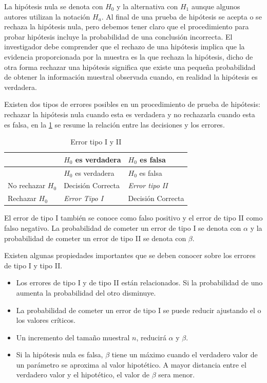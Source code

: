 \documentclass[letterpaper,]{book}
\providecommand{\tightlist}{%
  \setlength{\itemsep}{0pt}\setlength{\parskip}{0pt}}
\begin{document}
La hipótesis nula se denota con \(H_0\) y la alternativa con \(H_1\) aunque algunos autores utilizan la notación \(H_a\). Al final de una prueba de hipótesis se acepta o se rechaza la hipótesis nula, pero debemos tener claro que el procedimiento para probar hipótesis incluye la probabilidad de una conclusión incorrecta. El investigador debe comprender que el rechazo de una hipótesis implica que la evidencia proporcionada por la muestra es la que rechaza la hipótesis, dicho de otra forma rechazar una hipótesis significa que existe una pequeña probabilidad de obtener la información muestral observada cuando, en realidad la hipótesis es verdadera.

Existen dos tipos de errores posibles en un procedimiento de prueba de hipótesis: rechazar la hipótesis nula cuando esta es verdadera y no rechazarla cuando esta es falsa, en la \ref{tab:err} se resume la relación entre las decisiones y los errores.

\begin{longtable}[]{@{}lll@{}}
\caption{\label{tab:err}Error tipo I y II}\tabularnewline
\toprule
& \(H_0\) es verdadera & \(H_0\) es falsa\tabularnewline
\midrule
\endfirsthead
\toprule
& \(H_0\) es verdadera & \(H_0\) es falsa\tabularnewline
\midrule
\endhead
No rechazar \(H_0\) & Decisión Correcta & \emph{Error tipo II}\tabularnewline
Rechazar \(H_0\) & \emph{Error Tipo I} & Decisión Correcta\tabularnewline
\bottomrule
\end{longtable}

El error de tipo I también se conoce como falso positivo y el error de tipo II como falso negativo. La probabilidad de cometer un error de tipo I se denota con \(\alpha\) y la probabilidad de cometer un error de tipo II se denota con \(\beta\).

Existen algunas propiedades importantes que se deben conocer sobre los errores de tipo I y tipo II.

\begin{itemize}
\tightlist
\item
  Los errores de tipo I y de tipo II están relacionados. Si la probabilidad de uno aumenta la probabilidad del otro disminuye.
\item
  La probabilidad de cometer un error de tipo I se puede reducir ajustando el o los valores críticos.
\item
  Un incremento del tamaño muestral \(n\), reducirá \(\alpha\) y \(\beta\).
\item
  Si la hipótesis nula es falsa, \(\beta\) tiene un máximo cuando el verdadero valor de un parámetro se aproxima al valor hipotético. A mayor distancia
  entre el verdadero valor y el hipotético, el valor de \(\beta\) sera menor.
\end{itemize}
\end{document}
